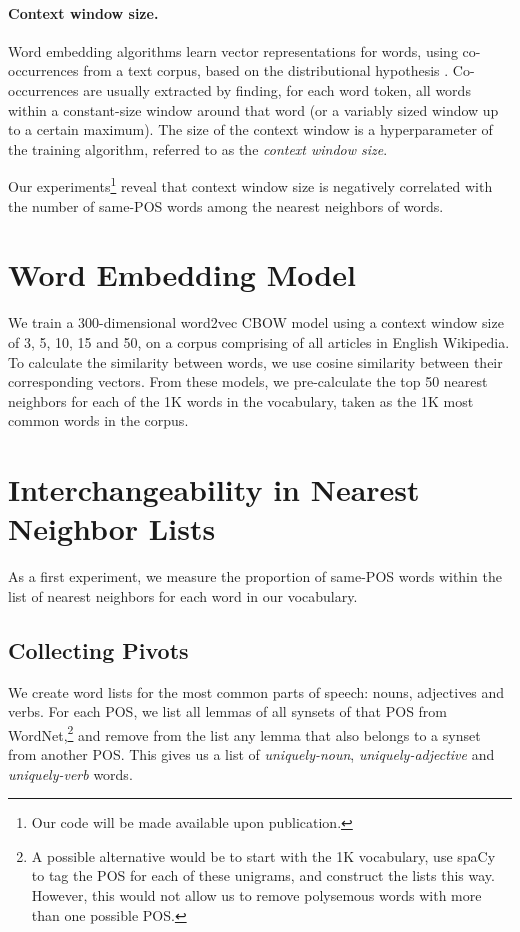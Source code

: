 \documentclass[11pt,a4paper]{article}
\begin{document}
    \paragraph{Context window size.}
    Word embedding algorithms learn vector representations for words,
    using co-occurrences from a text corpus,
    based on the distributional hypothesis \cite{harris1954distributional}.
    Co-occurrences are usually extracted by finding, for each word token, all
    words within a constant-size window around that word (or a variably sized
    window up to a certain maximum).
    The size of the context window is a hyperparameter of the training algorithm,
    referred to as the \textit{context window size}.

    Our experiments\footnote{Our code will be made available upon publication.}
    reveal that context window size is negatively correlated
    with the number of same-POS words among the nearest neighbors of words.
    
    \section{Word Embedding Model}\label{sec:model}
    
    We train a 300-dimensional word2vec CBOW model using a context window size of
    3, 5, 10, 15 and 50, on a corpus comprising of all articles in English Wikipedia.
    To calculate the similarity between words, we use cosine similarity
    between their corresponding vectors.
    From these models, we pre-calculate the top 50 nearest neighbors for
    each of the 1K words in the vocabulary, taken as the 1K most common
    words in the corpus.
    
    
    \section{Interchangeability in Nearest Neighbor Lists}\label{sec:nn}
    
    As a first experiment, we measure the proportion of same-POS words
    within the list of nearest neighbors for each word in our vocabulary.
    
    \subsection{Collecting Pivots}\label{sec:pivots}
    
    We create word lists for the most
    common parts of speech: nouns, adjectives and verbs.
    For each POS, we list all lemmas of all synsets of that POS from
    WordNet,\footnote{A possible alternative would be to start with the 1K
    vocabulary, use spaCy to tag the POS for each of these unigrams,
    and construct the lists this way.
    However, this would not allow us to remove polysemous words with more
    than one possible POS.}
    and remove from the list any lemma that also belongs to a synset from
    another POS.
    This gives us a list of \textit{uniquely-noun}, \textit{uniquely-adjective}
    and \textit{uniquely-verb} words.
    
\end{document}
